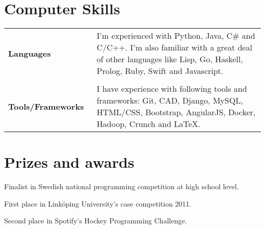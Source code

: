 \documentclass[a4paper,10pt]{article} %
\begin{document}
\section{Computer Skills}
\begin{tabular}{lp{13cm}}
\textbf{Languages} & \small{I'm experienced with Python, Java, C\# and C/C++. I'm also familiar with a great deal of other languages like Lisp, Go, Haskell, Prolog, Ruby, Swift and Javascript.}\\\\
\textbf{Tools/Frameworks~} & \small{I have experience with following tools and frameworks: Git, CAD, Django, MySQL, HTML/CSS, Bootstrap, AngularJS, Docker, Hadoop, Crunch and LaTeX.}


\end{tabular}




\section{Prizes and awards}
\begin{itemize}[noitemsep,topsep=0pt,parsep=0pt,partopsep=0pt]
\small{
\item Finalist in Swedish national programming competition at high school level.
\item First place in Linköping University’s case competition 2011.
\item Second place in Spotify’s Hockey Programming Challenge.
}
\end{itemize}
\end{document}
